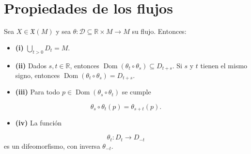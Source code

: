 \chapter{Propiedades de los flujos}
\label{ch:teo-17}
\begin{booktheorem}{}
Sea $X\in\mathfrak X(M)$ y sea $\theta:\mathcal D\subseteq\mathbb R\times M\to M$ su flujo. Entonces:

\begin{itemize}
\item \textbf{(i)} $\bigcup_{t>0}D_t=M$.
\item \textbf{(ii)} Dados $s,t\in\mathbb R$, entonces $\operatorname{Dom}(\theta_t\circ\theta_s)\subseteq D_{t+s}$. Si $s$ y $t$ tienen el mismo signo, entonces $\operatorname{Dom}(\theta_t\circ\theta_s)=D_{t+s}$.
\item \textbf{(iii)} Para todo $p\in\operatorname{Dom}(\theta_s\circ\theta_t)$ se cumple
\end{itemize}
\[
\theta_s\circ\theta_t(p)=\theta_{s+t}(p).
\]
\begin{itemize}
\item \textbf{(iv)} La función
\end{itemize}
\[
\theta_t:D_t\to D_{-t}
\]
es un difeomorfismo, con inversa $\theta_{-t}$.

\end{booktheorem}
